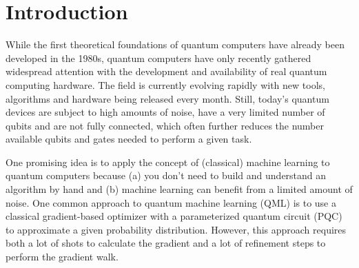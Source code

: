 \chapter{Introduction}
\label{chap:intro}


While the first theoretical foundations of quantum computers have already been
developed in the 1980s, quantum computers have only recently gathered widespread
attention with the development and availability of real quantum computing
hardware.
The field is currently evolving rapidly with new tools, algorithms and hardware
being released every month. %
Still, today's quantum devices are subject to high amounts of noise, have a very
limited number of qubits and are not fully connected, which often further
reduces the number available qubits and gates needed to perform a given task.

One promising idea is to apply the concept of (classical) machine learning to
quantum computers because (a) you don't need to build and understand an
algorithm by hand and (b) machine learning can benefit from a limited amount of
noise.
One common approach to quantum machine learning (QML) is to use a classical
gradient-based optimizer with a parameterized quantum circuit (PQC) to
approximate a given probability distribution.
However, this approach requires both a lot of shots to calculate the gradient
and a lot of refinement steps to perform the gradient walk.

